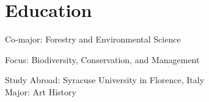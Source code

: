 \documentclass[]{baharmon_cv}
\begin{document}
{\vspace*{0.2cm}
\section{Education} 
\begin{minipage}[t]{0.80\textwidth} 
\end{minipage}
\begin{minipage}[t]{0.20\textwidth} 
\end{minipage}
Co-major: Forestry and Environmental Science
{\vspace*{0.1cm}

\begin{minipage}[t]{0.80\textwidth} 
\end{minipage}
\begin{minipage}[t]{0.20\textwidth} 
\end{minipage}
Focus: Biodiversity, Conservation, and Management
{\vspace*{0.1cm}

\begin{minipage}[t]{0.80\textwidth} 
\end{minipage}
\begin{minipage}[t]{0.20\textwidth} 
\end{minipage}
{\vspace*{0.1cm}

\begin{minipage}[t]{0.80\textwidth} 
\end{minipage}
\begin{minipage}[t]{0.20\textwidth} 
\end{minipage}
Study Abroad: Syracuse University in Florence, Italy \\
Major: Art History
{\vspace*{0.1cm}

\sectiondivider


}}}}}
\end{document}
